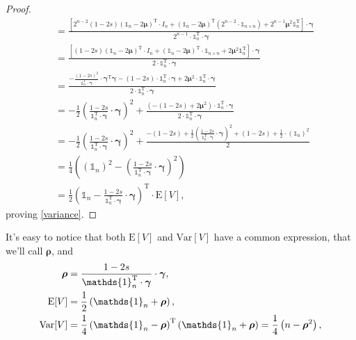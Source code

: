 \documentclass{article}
\newcommand{\0}{\mathbbold{0}}
\newcommand{\1}{\mathds{1}}
\newcommand{\2}{\mathbbold{2}}
\newcommand{\T}{^{\operatorname{T}}}
\begin{document}
\begin{proof}
\begin{align*}
        &= \frac{\left[
            2^{n-2}(1-2s)\left(\1_n - 2{\boldsymbol \mu}\right)\T\cdot I_n
            + \left(\1_n - 2{\boldsymbol \mu}\right)\T\left(2^{n-2}\cdot\1_{n\times n}\right)
            + 2^{n-1}{\boldsymbol \mu}^2\1_n\T
        \right] \cdot {\boldsymbol \gamma} }{2^{n-1}\cdot \1_n\T \cdot {\boldsymbol \gamma}} \\
        &= \frac{\left[
            (1-2s)\left(\1_n - 2{\boldsymbol \mu}\right)\T\cdot I_n
            + \left(\1_n - 2{\boldsymbol \mu}\right)\T\cdot\1_{n\times n}
            + 2{\boldsymbol \mu}^2\1_n\T
        \right] \cdot {\boldsymbol \gamma} }{2\cdot \1_n\T \cdot {\boldsymbol \gamma}} \\
        &= \frac{-\frac{(1-2s)^2}{\1_n\T\cdot{\boldsymbol \gamma}}\cdot {\boldsymbol \gamma}\T{\boldsymbol \gamma} - (1-2s)\cdot\1_n\T\cdot{\boldsymbol \gamma} + 2{\boldsymbol \mu}^2\cdot\1_n\T\cdot{\boldsymbol \gamma}}{2\cdot \1_n\T \cdot {\boldsymbol \gamma}} \\
        &= -\frac{1}{2}\left(\frac{1-2s}{\1_n\T\cdot {\boldsymbol \gamma}}\cdot {\boldsymbol \gamma}\right)^2 + \frac{\left(-(1-2s) + 2{\boldsymbol \mu}^2\right) \cdot \1_n\T\cdot {\boldsymbol \gamma} }{2\cdot \1_n\T \cdot {\boldsymbol \gamma}} \\
        &= -\frac{1}{2}\left(\frac{1-2s}{\1_n\T\cdot {\boldsymbol \gamma}}\cdot {\boldsymbol \gamma}\right)^2 + \frac{-(1-2s) + \frac{1}{2}\left(\frac{1-2s}{\1_n\T\cdot {\boldsymbol \gamma}}\cdot {\boldsymbol \gamma}\right)^2 + (1-2s) + \frac{1}{2}\cdot\left(\1_n\right)^2}{2} \\
        &= \frac{1}{4}\left(\left(\1_n\right)^2 - \left(\frac{1-2s}{\1_n\T\cdot {\boldsymbol \gamma}}\cdot {\boldsymbol \gamma}\right)^2 \right) \\
        &= \frac{1}{2}\left(\1_n - \frac{1-2s}{\1_n\T\cdot {\boldsymbol \gamma}}\cdot {\boldsymbol \gamma}\right)\T \cdot \text{E}[V],
    \end{align*}
    proving \eqref{variance}.
\end{proof}
It's easy to notice that both $\text{E}[V]$ and $\text{Var}[V]$ have a common expression, that we'll call ${\boldsymbol \rho}$, and
\begin{align*}
    {\boldsymbol \rho} &= \frac{1-2s}{\1_n\T\cdot {\boldsymbol \gamma}}\cdot {\boldsymbol \gamma}, \\
    \textup{E}[V] &= \frac{1}{2}\left(\1_n + {\boldsymbol \rho}\right) , \\
    \textup{Var}[V] &= \frac{1}{4}\left(\1_n - {\boldsymbol \rho}\right)\T\left(\1_n + {\boldsymbol \rho}\right) = \frac{1}{4}\left(n - {\boldsymbol \rho}^2\right)  ,
\end{align*}
\end{document}
